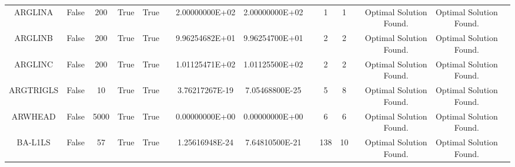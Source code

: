 \begin{longtable}{ccccccccccccccc}
	\cellcolor{default2} ARGLINA& \cellcolor{default2} False& \cellcolor{default2} 200& \cellcolor{default2} True& \cellcolor{default2} True& \cellcolor{header} & \cellcolor{best} 2.00000000E+02& \cellcolor{best} 2.00000000E+02& \cellcolor{header} & \cellcolor{best} 1& \cellcolor{best} 1& \cellcolor{header} & \cellcolor{default2} Optimal Solution Found.& \cellcolor{default2} Optimal Solution Found.& \cellcolor{header} \\
	\cellcolor{default1} ARGLINB& \cellcolor{default1} False& \cellcolor{default1} 200& \cellcolor{default1} True& \cellcolor{default1} True& \cellcolor{header} & \cellcolor{best} 9.96254682E+01& \cellcolor{ok} 9.96254700E+01& \cellcolor{header} & \cellcolor{best} 2& \cellcolor{best} 2& \cellcolor{header} & \cellcolor{default1} Optimal Solution Found.& \cellcolor{default1} Optimal Solution Found.& \cellcolor{header} \\
	\cellcolor{default2} ARGLINC& \cellcolor{default2} False& \cellcolor{default2} 200& \cellcolor{default2} True& \cellcolor{default2} True& \cellcolor{header} & \cellcolor{best} 1.01125471E+02& \cellcolor{ok} 1.01125500E+02& \cellcolor{header} & \cellcolor{best} 2& \cellcolor{best} 2& \cellcolor{header} & \cellcolor{default2} Optimal Solution Found.& \cellcolor{default2} Optimal Solution Found.& \cellcolor{header} \\
	\cellcolor{default1} ARGTRIGLS& \cellcolor{default1} False& \cellcolor{default1} 10& \cellcolor{default1} True& \cellcolor{default1} True& \cellcolor{header} & \cellcolor{ok} 3.76217267E-19& \cellcolor{best} 7.05468800E-25& \cellcolor{header} & \cellcolor{best} 5& \cellcolor{ok} 8& \cellcolor{header} & \cellcolor{default1} Optimal Solution Found.& \cellcolor{default1} Optimal Solution Found.& \cellcolor{header} \\
	\cellcolor{default2} ARWHEAD& \cellcolor{default2} False& \cellcolor{default2} 5000& \cellcolor{default2} True& \cellcolor{default2} True& \cellcolor{header} & \cellcolor{best} 0.00000000E+00& \cellcolor{best} 0.00000000E+00& \cellcolor{header} & \cellcolor{best} 6& \cellcolor{best} 6& \cellcolor{header} & \cellcolor{default2} Optimal Solution Found.& \cellcolor{default2} Optimal Solution Found.& \cellcolor{header} \\
	\cellcolor{default1} BA-L1LS& \cellcolor{default1} False& \cellcolor{default1} 57& \cellcolor{default1} True& \cellcolor{default1} True& \cellcolor{header} & \cellcolor{best} 1.25616948E-24& \cellcolor{ok} 7.64810500E-21& \cellcolor{header} & \cellcolor{poor} 138& \cellcolor{best} 10& \cellcolor{header} & \cellcolor{default1} Optimal Solution Found.& \cellcolor{default1} Optimal Solution Found.& \cellcolor{header} \\

\end{longtable}
